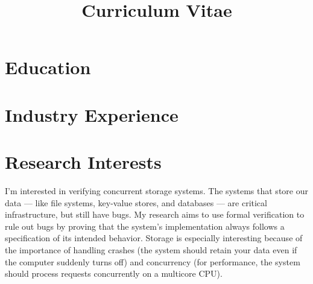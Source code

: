 \documentclass[11pt,a4paper,roman]{moderncv}   %
\title{Curriculum Vitae}               %
\begin{document}
\makecvtitle

\section{Education}

\section{Industry Experience}

\section{Research Interests}

I'm interested in verifying concurrent storage systems. The systems that store
our data --- like file systems, key-value stores, and databases --- are critical
infrastructure, but still have bugs. My research aims to use formal verification
to rule out bugs by proving that the system's implementation always follows a
specification of its intended behavior. Storage is especially interesting
because of the importance of handling crashes (the system should retain your
data even if the computer suddenly turns off) and concurrency (for performance,
the system should process requests concurrently on a multicore CPU).

\end{document}
